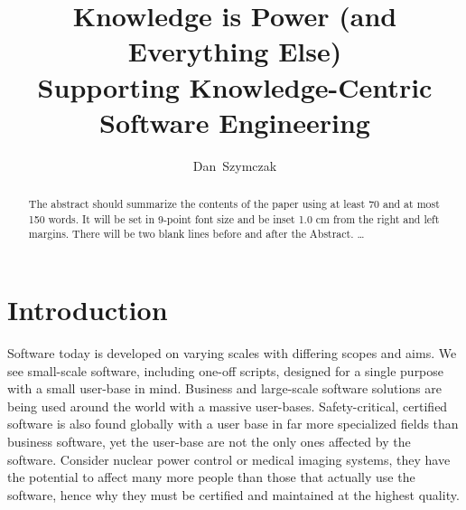 \documentclass{llncs}
\begin{document}
%
\mainmatter              %
%
\title{Knowledge is Power (and Everything Else) \\ 
Supporting Knowledge-Centric Software Engineering}
%
%
\author{Dan~Szymczak \and
{} \and
{} \and
{}}
%
%
%
\maketitle              %

\begin{abstract}
The abstract should summarize the contents of the paper
using at least 70 and at most 150 words. It will be set in 9-point
font size and be inset 1.0 cm from the right and left margins.
There will be two blank lines before and after the Abstract. \dots
{}
\end{abstract}
%
\section{Introduction}

Software today is developed on varying scales with differing scopes and aims. We see small-scale software, including one-off scripts, designed for a single purpose with a small user-base in mind. Business and large-scale software solutions are being used around the world with a massive user-bases. Safety-critical, certified software is also found globally with a user base in far more specialized fields than business software, yet the user-base are not the only ones affected by the software. Consider nuclear power control or medical imaging systems, they have the potential to affect many more people than those that actually use the software, hence why they must be certified and maintained at the highest quality.
\end{document}
